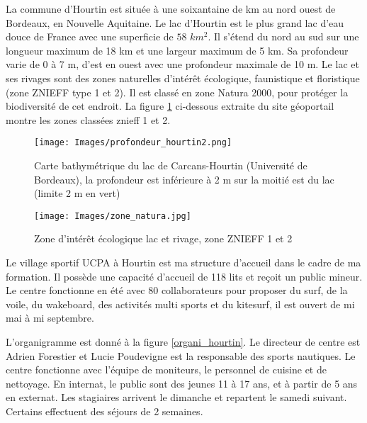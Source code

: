 \documentclass[11pt,a4paper]{report}
\begin{document}
La commune d'Hourtin est située à une soixantaine de km au nord ouest 
de Bordeaux, en Nouvelle Aquitaine. Le lac d'Hourtin est le plus grand
lac d'eau douce de France avec une superficie de $58 \,\,km^2$.
Il s'étend du nord au sud sur une longueur maximum de 18 km 
et une largeur maximum de 5 km. Sa profondeur varie de 0 à 7 m, 
d'est en ouest avec une profondeur maximale de 10 m.
Le lac et ses rivages sont des zones naturelles  d'intér\^et écologique, 
faunistique et floristique (zone ZNIEFF type 1 et 2). Il est classé
en zone  Natura 2000\cite{natura2000}, pour protéger la biodiversité
de cet endroit. La figure \ref{lac_znieff} ci-dessous extraite
du site géoportail\cite{geoportail} montre les zones classées znieff 1 et 2.


\begin{figure}
\begin{minipage}{0.4\textwidth}
\texttt{[image: Images/profondeur\_hourtin2.png]} 
\caption{Carte bathymétrique du lac de Carcans-Hourtin (Université de Bordeaux\cite{bathy}), la profondeur est inférieure
à 2 m sur la moitié est du lac (limite 2 m en vert)\label{carte_profondeur}}
\end{minipage}
\hfill
\begin{minipage}{0.4\textwidth}
\texttt{[image: Images/zone\_natura.jpg]} 
\caption{Zone d'intér\^et écologique lac et rivage, zone ZNIEFF 1 et 2\label{lac_znieff}}
 \end{minipage}
\end{figure}
\FloatBarrier
Le village sportif UCPA à Hourtin est ma structure d'accueil dans le cadre de
ma formation. Il possède une capacité d'accueil de 118 lits et reçoit un 
public mineur. Le centre fonctionne en été avec 80 collaborateurs pour
proposer du surf, de la voile, du wakeboard, des activités multi sports
et du kitesurf, il est ouvert de mi mai à mi septembre.
 
L'organigramme est donné à la figure \ref{organi_hourtin}.
Le directeur de centre est Adrien Forestier et 
Lucie Poudevigne est la responsable des sports nautiques.
Le centre fonctionne avec l'équipe de moniteurs, le personnel 
de cuisine et de nettoyage. En internat, le public sont des jeunes
11 à 17 ans, et  à partir de 5 ans  en externat.
Les stagiaires arrivent le dimanche et repartent
le samedi suivant. Certains effectuent des séjours de 2 semaines.
\end{document}
